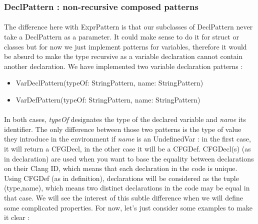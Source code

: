 \documentclass{report}
\begin{document}
\subsubsection{DeclPattern : non-recursive composed patterns}

\paragraph{}
\hspace{4mm}The difference here with ExprPattern is that our subclasses of DeclPattern never take a DeclPattern as a parameter. It could make sense to do it for struct or classes but for now we just implement patterns for variables, therefore it would be
absurd to make the type recursive as a variable declaration cannot contain another declaration. We have implemented two variable declaration patterns :

\vspace{1.5mm}
\begin{itemize}
\item VarDeclPattern(typeOf: StringPattern, name: StringPattern)\vspace{1mm}
\item VarDefPattern(typeOf: StringPattern, name: StringPattern)\vspace{1mm}
\end{itemize}

\paragraph{}
\hspace{4mm}In both cases, \textit{typeOf} designates the type of the declared variable and \textit{name} its identifier.
The only difference between those two patterns is the type of value they introduce in the environment if \textit{name} is an UndefinedVar :
in the first case, it will return a CFGDecl, in the other case it will be a CFGDef. CFGDecl(s) (as in declaration) are used when you want to base the equality between declarations
on their Clang ID, which means that each declaration in the code is unique. Using CFGDef (as in definition), declarations will be considered as the tuple (type,name), which means two distinct declarations
in the code may be equal in that case. We will see the interest of this subtle difference when we will define some complicated properties. For now, let's just consider some examples to make it clear :
\end{document}
